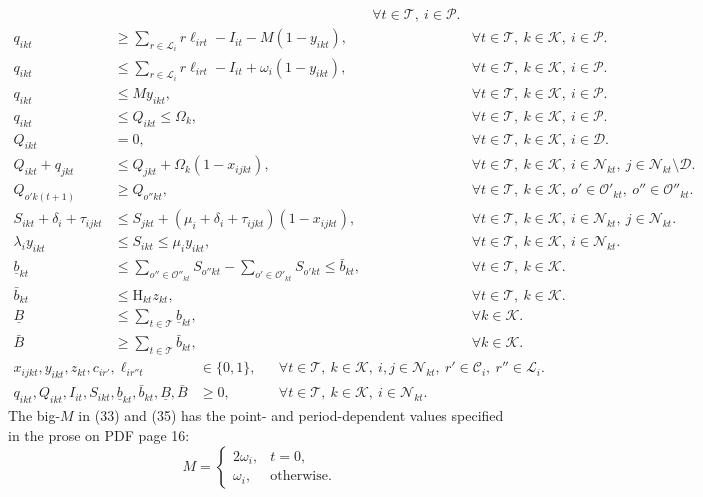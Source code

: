\documentclass[10pt]{article}
\begin{document}
\begin{align}
&&\forall t\in\mathcal T,\ i\in\mathcal P.\tag{32}\\
 q_{ikt}&\geqslant\sum_{r\in\mathcal L_i}r\ell_{irt}-I_{it}-M(1-y_{ikt}),
&&\forall t\in\mathcal T,\ k\in\mathcal K,\ i\in\mathcal P.\tag{33}\\
 q_{ikt}&\leqslant\sum_{r\in\mathcal L_i}r\ell_{irt}-I_{it}+\omega_i(1-y_{ikt}),
&&\forall t\in\mathcal T,\ k\in\mathcal K,\ i\in\mathcal P.\tag{34}\\
 q_{ikt}&\leqslant My_{ikt},
&&\forall t\in\mathcal T,\ k\in\mathcal K,\ i\in\mathcal P.\tag{35}\\
 q_{ikt}&\leqslant Q_{ikt}\leqslant\Omega_k,
&&\forall t\in\mathcal T,\ k\in\mathcal K,\ i\in\mathcal P.\tag{36}\\
 Q_{ikt}&=0,
&&\forall t\in\mathcal T,\ k\in\mathcal K,\ i\in\mathcal D.\tag{37}\\
 Q_{ikt}+q_{jkt}&\leqslant Q_{jkt}+\Omega_k(1-x_{ijkt}),
&&\forall t\in\mathcal T,\ k\in\mathcal K,\ i\in\mathcal N_{kt},\ j\in\mathcal N_{kt}\setminus\mathcal D.\tag{38}\\
 Q_{o'k(t+1)}&\geqslant Q_{o''kt},
&&\forall t\in\mathcal T,\ k\in\mathcal K,\ o'\in\mathcal O'_{kt},\ o''\in\mathcal O''_{kt}.\tag{39}\\
 S_{ikt}+\delta_i+\tau_{ijkt}
&\leqslant S_{jkt}+(\mu_i+\delta_i+\tau_{ijkt})(1-x_{ijkt}),
&&\forall t\in\mathcal T,\ k\in\mathcal K,\ i\in\mathcal N_{kt},\ j\in\mathcal N_{kt}.\tag{40}\\
\lambda_i y_{ikt}&\leqslant S_{ikt}\leqslant\mu_i y_{ikt},
&&\forall t\in\mathcal T,\ k\in\mathcal K,\ i\in\mathcal N_{kt}.\tag{41}\\
\underline b_{kt}&\leqslant\sum_{o''\in\mathcal O''_{kt}}S_{o''kt}
-\sum_{o'\in\mathcal O'_{kt}}S_{o'kt}\leqslant\bar b_{kt},
&&\forall t\in\mathcal T,\ k\in\mathcal K.\tag{42}\\
\bar b_{kt}&\leqslant\mathrm H_{kt}z_{kt},
&&\forall t\in\mathcal T,\ k\in\mathcal K.\tag{43}\\
\underline B&\leqslant\sum_{t\in\mathcal T}\underline b_{kt},
&&\forall k\in\mathcal K.\tag{44}\\
\bar B&\geqslant\sum_{t\in\mathcal T}\bar b_{kt},
&&\forall k\in\mathcal K.\tag{45}
\end{align}
\begin{align}
 x_{ijkt},y_{ikt},z_{kt},c_{ir'},\ell_{ir''t}&\in\{0,1\},
&&\forall t\in\mathcal T,\ k\in\mathcal K,\ i,j\in\mathcal N_{kt},\ r'\in\mathcal C_i,\ r''\in\mathcal L_i.\tag{46}\\
 q_{ikt},Q_{ikt},I_{it},S_{ikt},\underline b_{kt},\bar b_{kt},\underline B,\bar B&\geqslant0,
&&\forall t\in\mathcal T,\ k\in\mathcal K,\ i\in\mathcal N_{kt}.\tag{47}
\end{align}
The big-$M$ in (33) and (35) has the point- and period-dependent values specified in the prose on PDF page 16:
\[
 M=\begin{cases}2\omega_i,&t=0,\\\omega_i,&\text{otherwise}.\end{cases}
\]
\end{document}
